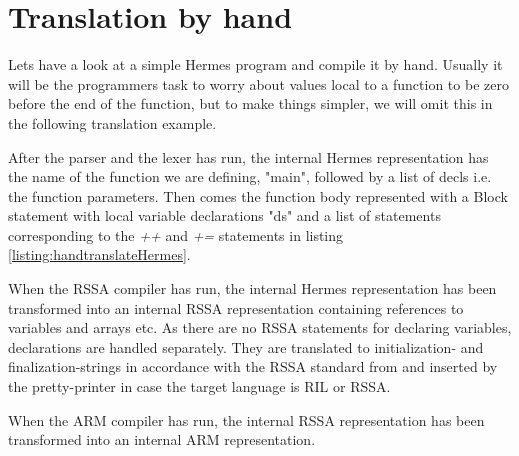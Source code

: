 \section{Translation by hand}
Lets have a look at a simple Hermes program and compile it by hand.
Usually it will be the programmers task to worry about values local to a function to be zero before the end of the function, but to make things simpler, we will omit this in the following translation example.

After the parser and the lexer has run, the internal Hermes representation has the name of the function we are defining, "main", followed by a list of decls i.e. the function parameters.
Then comes the function body represented with a Block statement with local variable declarations "ds" and a list of statements corresponding to the \emph{++} and \emph{+=} statements in listing \ref{listing:handtranslateHermes}.

When the RSSA compiler has run, the internal Hermes representation has been transformed into an internal RSSA representation containing references to variables and arrays etc.
As there are no RSSA statements for declaring variables, declarations are handled separately. They are translated to initialization- and finalization-strings in accordance with the RSSA standard from\cite{10.1007/978-3-319-41579-6_16} and inserted by the pretty-printer in case the target language is RIL or RSSA.

When the ARM compiler has run, the internal RSSA representation has been transformed into an internal ARM representation.





